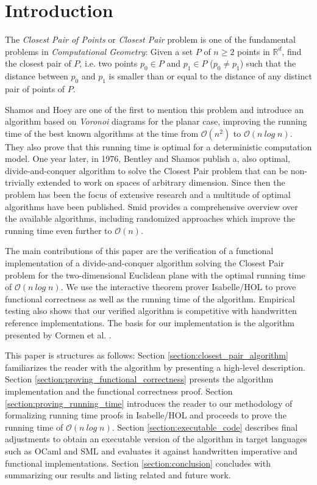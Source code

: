 \documentclass{llncs}
\begin{document}
\section{Introduction}

The \textit{Closest Pair of Points} or \textit{Closest Pair} problem is one of the fundamental
problems in \textit{Computational Geometry}: Given a set $P$ of $n \geq 2$ points in $\mathbb{R}^d$,
find the closest pair of $P$, i.e. two points $p_0 \in P$ and $p_1 \in P$ ($p_0 \ne p_1$) such that 
the distance between $p_0$ and $p_1$ is smaller than or equal to the distance of any distinct pair 
of points of $P$.

Shamos and Hoey \cite{Closest-Point-Problems:1975} are one of the first to mention this problem and
introduce an algorithm based on \textit{Voronoi} diagrams for the planar case, improving the running 
time of the best known algorithms at the time from $\mathcal{O}(n^2)$ to
$\mathcal{O}(n\ \mathit{log}\;n)$. They also prove that this running time is optimal for a
deterministic computation model. One year later, in 1976, Bentley and Shamos
\cite{Divide-And-Conquer-In-Multidimensional-Space:1976} publish a, also optimal, divide-and-conquer
algorithm to solve the Closest Pair problem that can be non-trivially extended to work on
spaces of arbitrary dimension. Since then the problem has been the focus of extensive research and
a multitude of optimal algorithms have been published. Smid \cite{Handbook-Computational-Geometry:2000}
provides a comprehensive overview over the available algorithms, including randomized approaches which
improve the running time even further to $\mathcal{O}(n)$.

The main contributions of this paper are the verification of a functional implementation of a
divide-and-conquer algorithm solving the Closest Pair problem for the two-dimensional Euclidean plane
with the optimal running time of $\mathcal{O}(n\ \mathit{log}\;n)$. We use the interactive theorem 
prover Isabelle/HOL \cite{LNCS2283,Concrete} to prove functional correctness as well as the 
running time of the algorithm. Empirical testing also shows that our verified algorithm is 
competitive with handwritten reference implementations. The basis for our implementation 
is the algorithm presented by Cormen et al. \cite{Introduction-to-Algorithms:2009}.

This paper is structures as follows:
Section \ref{section:closest_pair_algorithm} familiarizes the reader with the algorithm by presenting a
high-level description. Section \ref{section:proving_functional_correctness} presents the algorithm
implementation and the functional correctness proof. Section \ref{section:proving_running_time} introduces
the reader to our methodology of formalizing running time proofs in Isabelle/HOL and proceeds to prove 
the running time of $\mathcal{O}(n\ \mathit{log}\;n)$. Section \ref{section:executable_code}
describes final adjustments to obtain an executable version of the algorithm in target languages
such as OCaml and SML and evaluates it against handwritten imperative and functional implementations. 
Section \ref{section:conclusion} concludes with summarizing our results and listing related and future work.
\end{document}
